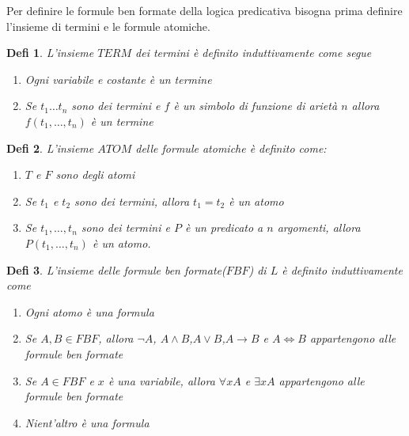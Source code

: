 \documentclass[a4paper]{book}
\newtheorem*{defi}{Defi}%
\begin{document}
Per definire le formule ben formate della logica predicativa bisogna prima definire
l'insieme di termini e le formule atomiche.
\begin{defi}
    L'insieme $TERM$ dei termini è definito induttivamente come segue
    \begin{enumerate}
        \item Ogni variabile e costante è un termine
        \item Se $t_1 \dots t_n$ sono dei termini e $f$ è un simbolo di funzione di arietà $n$
              allora $f(t_1,\dots,t_n)$ è un termine
    \end{enumerate}
\end{defi}
\begin{defi}
    L'insieme $ATOM$ delle formule atomiche è definito come:
    \begin{enumerate}
        \item $T$ e $F$ sono degli atomi
        \item Se $t_1$ e $t_2$ sono dei termini, allora $t_1 = t_2$ è un atomo
        \item Se $t_1,\dots,t_n$ sono dei termini e $P$ è un predicato a $n$ argomenti,
              allora $P(t_1,\dots,t_n)$ è un atomo.
    \end{enumerate}
\end{defi}
\begin{defi}
    L'insieme delle formule ben formate($FBF$) di $L$ è definito induttivamente come
    \begin{enumerate}
        \item Ogni atomo è una formula
        \item Se $A,B \in FBF$, allora $\neg A$, $A \land B$,$A \lor B$,$A \rightarrow B$
              e $A \iff B$ appartengono alle formule ben formate
        \item Se $A \in FBF$ e $x$ è una variabile, allora $\forall x A$ e $\exists x A$
              appartengono alle formule ben formate
        \item Nient'altro è una formula
    \end{enumerate}
\end{defi}
\end{document}
